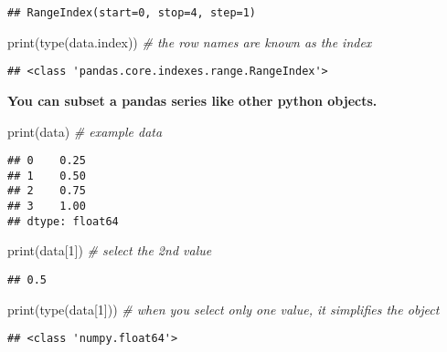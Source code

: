\documentclass[
]{book}
\newenvironment{Shaded}{\begin{snugshade}}{\end{snugshade}}
\newcommand{\BuiltInTok}[1]{#1}
\newcommand{\CommentTok}[1]{\textcolor[rgb]{0.56,0.35,0.01}{\textit{#1}}}
\newcommand{\DecValTok}[1]{\textcolor[rgb]{0.00,0.00,0.81}{#1}}
\newcommand{\NormalTok}[1]{#1}
\begin{document}
\begin{verbatim}
## RangeIndex(start=0, stop=4, step=1)
\end{verbatim}

\begin{Shaded}
\begin{Highlighting}[]
\BuiltInTok{print}\NormalTok{(}\BuiltInTok{type}\NormalTok{(data.index)) }\CommentTok{\# the row names are known as the index}
\end{Highlighting}
\end{Shaded}

\begin{verbatim}
## <class 'pandas.core.indexes.range.RangeIndex'>
\end{verbatim}

\textbf{You can subset a pandas series like other python objects.}

\begin{Shaded}
\begin{Highlighting}[]
\BuiltInTok{print}\NormalTok{(data) }\CommentTok{\# example data}
\end{Highlighting}
\end{Shaded}

\begin{verbatim}
## 0    0.25
## 1    0.50
## 2    0.75
## 3    1.00
## dtype: float64
\end{verbatim}

\begin{Shaded}
\begin{Highlighting}[]
\BuiltInTok{print}\NormalTok{(data[}\DecValTok{1}\NormalTok{]) }\CommentTok{\# select the 2nd value}
\end{Highlighting}
\end{Shaded}

\begin{verbatim}
## 0.5
\end{verbatim}

\begin{Shaded}
\begin{Highlighting}[]
\BuiltInTok{print}\NormalTok{(}\BuiltInTok{type}\NormalTok{(data[}\DecValTok{1}\NormalTok{])) }\CommentTok{\# when you select only one value, it simplifies the object}
\end{Highlighting}
\end{Shaded}

\begin{verbatim}
## <class 'numpy.float64'>
\end{verbatim}
\end{document}
